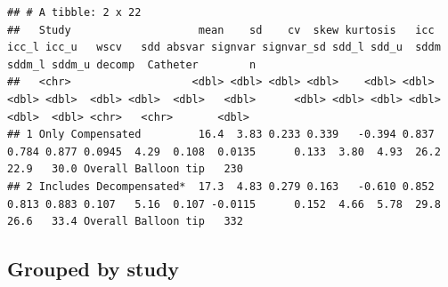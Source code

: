 \documentclass[
]{article}
\begin{document}
\begin{verbatim}
## # A tibble: 2 x 22
##   Study                    mean    sd    cv  skew kurtosis   icc icc_l icc_u   wscv   sdd absvar signvar signvar_sd sdd_l sdd_u  sddm sddm_l sddm_u decomp  Catheter        n
##   <chr>                   <dbl> <dbl> <dbl> <dbl>    <dbl> <dbl> <dbl> <dbl>  <dbl> <dbl>  <dbl>   <dbl>      <dbl> <dbl> <dbl> <dbl>  <dbl>  <dbl> <chr>   <chr>       <dbl>
## 1 Only Compensated         16.4  3.83 0.233 0.339   -0.394 0.837 0.784 0.877 0.0945  4.29  0.108  0.0135      0.133  3.80  4.93  26.2   22.9   30.0 Overall Balloon tip   230
## 2 Includes Decompensated*  17.3  4.83 0.279 0.163   -0.610 0.852 0.813 0.883 0.107   5.16  0.107 -0.0115      0.152  4.66  5.78  29.8   26.6   33.4 Overall Balloon tip   332
\end{verbatim}

\hypertarget{grouped-by-study}{%
\subsection{Grouped by study}\label{grouped-by-study}}
\end{document}
